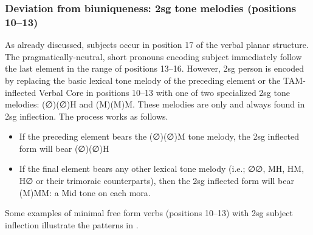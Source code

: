 \documentclass[output=paper]{langscibook}
\begin{document}
\subsubsection{Deviation from biuniqueness: 2sg tone melodies (positions 10{}--13)}
\label{bkm:Ref113308088}
As already discussed, subjects occur in position 17 of the verbal planar structure. The pragmatically-neutral, short pronouns encoding subject immediately follow the last element in the range of positions 13{}--16. However, 2sg person is encoded by replacing the basic lexical tone melody of the preceding element or the TAM-inflected Verbal Core in positions 10{}--13 with one of two specialized 2sg tone melodies: (∅)(∅)H and (M)(M)M. These melodies are only and always found in 2sg inflection. The process works as follows.

\begin{itemize}
\item 
If the preceding element bears the (∅)(∅)M tone melody, the 2sg inflected form will bear (∅)(∅)H
\item
If the final element bears any other lexical tone melody (i.e.; ∅∅, MH, HM, H∅ or their trimoraic counterparts), then the 2sg inflected form will bear (M)MM: a Mid tone on each mora.
\end{itemize}

Some examples of minimal free form verbs (positions 10{}--13) with 2sg subject inflection illustrate the patterns in .


\begin{table}
    \caption{2sg tone melodies on verbs}
    \label{tab:zenz:key:6}
\end{table}
\end{document}

